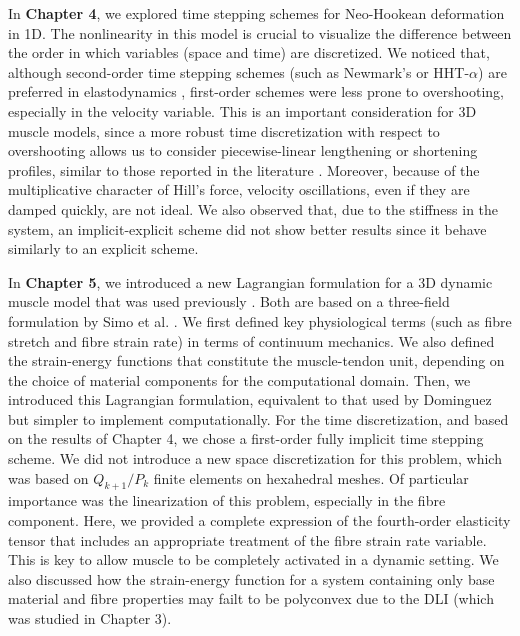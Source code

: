 \documentclass{sfuthesis}
\numberwithin{equation}{section}
\numberwithin{figure}{chapter}
\numberwithin{table}{chapter}
\theoremstyle{definition}
\begin{document}
In \textbf{Chapter 4}, we explored time stepping schemes for Neo-Hookean deformation in 1D. The nonlinearity in this model is crucial to visualize the difference between the order in which variables (space and time) are discretized. We noticed that, although second-order time stepping schemes (such as Newmark's or HHT-$\alpha$) are preferred in elastodynamics \cite{HughesBook}, first-order schemes were less prone to overshooting, especially in the velocity variable. This is an important consideration for 3D muscle models, since a more robust time discretization with respect to overshooting allows us to consider piecewise-linear lengthening or shortening profiles, similar to those reported in the literature \cite{HerzogLeonard2002}. Moreover, because of the multiplicative character of Hill's force, velocity oscillations, even if they are damped quickly, are not ideal. We also observed that, due to the stiffness in the system, an implicit-explicit scheme did not show better results since it behave similarly to an explicit scheme.

In \textbf{Chapter 5}, we introduced a new Lagrangian formulation for a 3D dynamic muscle model that was used previously \cite{Seba,KonnoEtAl2022_CP,Paper3_RossEtAl2021,Paper2_RyanEtAl2020,Paper1_WakelingEtAl2020}. Both are based on a three-field formulation by Simo et al. \cite{SimoTaylorPister1985}. We first defined key physiological terms (such as fibre stretch and fibre strain rate) in terms of continuum mechanics. We also defined the strain-energy functions that constitute the muscle-tendon unit, depending on the choice of material components for the computational domain. Then, we introduced this Lagrangian formulation, equivalent to that used by Dominguez \cite{Seba} but simpler to implement computationally. For the time discretization, and based on the results of Chapter 4, we chose a first-order fully implicit time stepping scheme. We did not introduce a new space discretization for this problem, which was based on $Q_{k+1}/P_{k}$ finite elements on hexahedral meshes. Of particular importance was the linearization of this problem, especially in the fibre component. Here, we provided a complete expression of the fourth-order elasticity tensor that includes an appropriate treatment of the fibre strain rate variable. This is key to allow muscle to be completely activated in a dynamic setting. We also discussed how the strain-energy function for a system containing only base material and fibre properties may failt to be polyconvex due to the DLI (which was studied in Chapter 3).
\end{document}
